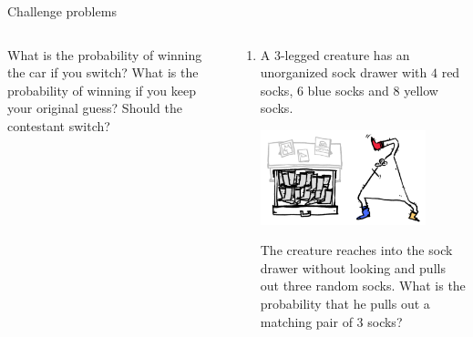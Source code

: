 \documentclass[9pt,aspectratio=169]{beamer}
\begin{document}
\begin{frame}{Challenge problems}
\begin{columns}[T]
\begin{column}{0.5\textwidth}
{\begin{enumerate}
        What is the probability of winning the car if you switch? 
        What is the probability of winning if you keep your original guess? Should the contestant switch?
        \seti
      \end{enumerate}
      }
    \end{column}
    \begin{column}{0.5\textwidth}
      \begin{enumerate}
        \conti
        \item A 3-legged creature has an unorganized sock drawer with $4$ red socks, $6$ blue socks and $8$ yellow socks.
        \begin{center}
          \vspace*{-1ex}   
          \includegraphics[width = 0.80\textwidth]{03 - Probability/3-leg-creature.png}
          \vspace*{-1ex}   
        \end{center} 
        The creature reaches into the sock drawer without looking and pulls out three random socks.  What is the probability that he pulls out a matching pair of $3$ socks?
      \end{enumerate}
    \end{column}
  \end{columns}
\end{frame}
\end{document}
